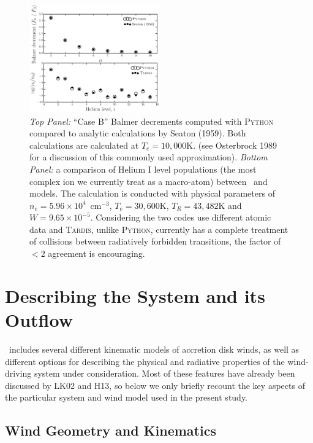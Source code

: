 \documentclass[preprint, a4paper, 11pt]{aastex}
\begin{document}
\begin{figure}
\centering
\includegraphics[width=0.5\textwidth]{figures/fig_caseb_tardis.eps}
\caption{
{\sl Top Panel:} ``Case B'' Balmer decrements computed 
with \textsc{Python} compared to analytic calculations
by Seaton (1959). Both calculations are calculated at $T_e=10,000$K.
(see Osterbrock 1989 for a discussion of this commonly used approximation).
{\sl Bottom Panel:}  a comparison of Helium I level populations (the most complex ion we currently 
treat as a macro-atom) between \py\ and \tar models. 
The calculation is conducted with physical parameters of $n_e=5.96\times10^4$~cm$^{-3}$,
$T_e=30,600$K, $T_R=43,482$K and $W=9.65\times10^{-5}$. 
Considering the two codes use different atomic data and \textsc{Tardis,} unlike \textsc{Python,} currently has a complete treatment of collisions between 
radiatively forbidden transitions, the factor of 
$<2$ agreement is encouraging. 
}
\label{tests}
\end{figure}


\nocite{osterbrock}
\nocite{seaton1959}

%
%

\section{Describing the System and its Outflow}

\py\ includes several different kinematic models of accretion disk
winds, as well as different options for describing the physical and
radiative properties of the wind-driving system under
consideration. Most of these features have already been discussed by
LK02 and H13, so below we only briefly recount the key aspects of the
particular system and wind model used in the present study.

\subsection{Wind Geometry and Kinematics}
\label{kinematics}
\end{document}
